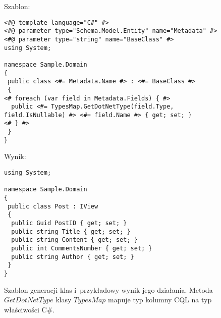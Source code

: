 \begin{figure}[!ht]
Szablon:

\begin{verbatim}
<#@ template language="C#" #>
<#@ parameter type="Schema.Model.Entity" name="Metadata" #>
<#@ parameter type="string" name="BaseClass" #>
using System;

namespace Sample.Domain
{
 public class <#= Metadata.Name #> : <#= BaseClass #>
 {
<# foreach (var field in Metadata.Fields) { #>
  public <#= TypesMap.GetDotNetType(field.Type, field.IsNullable) #> <#= field.Name #> { get; set; }
<# } #>
 }
}
\end{verbatim}

Wynik:

\begin{verbatim}
using System;

namespace Sample.Domain
{
 public class Post : IView
 {
  public Guid PostID { get; set; }
  public string Title { get; set; }
  public string Content { get; set; }
  public int CommentsNumber { get; set; }
  public string Author { get; set; }
 }
}
\end{verbatim}

\caption{
 Szablon generacji klas i~przykładowy wynik jego działania.
 Metoda $GetDotNetType$ klasy $TypesMap$ mapuje typ kolumny CQL na typ właściwości C\#.}
\label{fig:single:template_class}
\end{figure}
